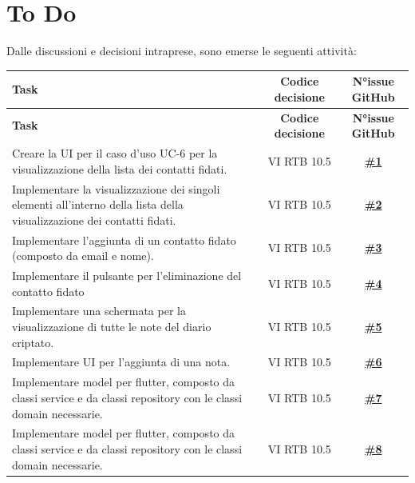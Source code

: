\documentclass[a4paper,12pt]{article}
\begin{document}
\section{To Do}
Dalle discussioni e decisioni intraprese, sono emerse le seguenti attività:
\small
\renewcommand{\arraystretch}{1.2}
\begin{longtable}{|p{}|c|c|}
\hline
\rowcolor{gray!60}
\textbf{Task} & \textbf{Codice decisione} & \textbf{N°issue GitHub} \\
\hline
\endfirsthead
\hline
\rowcolor{gray!60}
\textbf{Task} & \textbf{Codice decisione} & \textbf{N°issue GitHub} \\
\hline
\endhead
\hline
\endlastfoot
\rowcolor{white}
Creare la UI per il caso d'uso UC-6 per la visualizzazione della lista dei contatti fidati. & VI RTB 10.5 & \href{https://github.com/SWE-BitByBit/project-PoC/issues/1}{\textbf{\#1}} \\
\hline
\rowcolor{gray!20}
Implementare la visualizzazione dei singoli elementi all'interno della lista della visualizzazione dei contatti fidati. & VI RTB 10.5 & \href{https://github.com/SWE-BitByBit/project-PoC/issues/2}{\textbf{\#2}} \\
\hline
\rowcolor{white}
Implementare l'aggiunta di un contatto fidato (composto da email e nome). & VI RTB 10.5 & \href{https://github.com/SWE-BitByBit/project-PoC/issues/3}{\textbf{\#3}} \\
\hline
\rowcolor{gray!20}
Implementare il pulsante per l'eliminazione del contatto fidato & VI RTB 10.5 & \href{https://github.com/SWE-BitByBit/project-PoC/issues/4}{\textbf{\#4}} \\
\hline
\rowcolor{white}
Implementare una schermata per la visualizzazione di tutte le note del diario criptato. & VI RTB 10.5 & \href{https://github.com/SWE-BitByBit/project-PoC/issues/5}{\textbf{\#5}} \\
\hline
\rowcolor{gray!20}
Implementare UI per l'aggiunta di una nota. & VI RTB 10.5 & \href{https://github.com/SWE-BitByBit/project-PoC/issues/6}{\textbf{\#6}} \\
\hline
\rowcolor{white}
Implementare model per flutter, composto da classi service e da classi repository con le classi domain necessarie. & VI RTB 10.5 & \href{https://github.com/SWE-BitByBit/project-PoC/issues/7}{\textbf{\#7}} \\
\hline
\rowcolor{gray!20}
Implementare model per flutter, composto da classi service e da classi repository con le classi domain necessarie. & VI RTB 10.5 & \href{https://github.com/SWE-BitByBit/project-PoC/issues/8}{\textbf{\#8}} \\

\end{longtable}
\end{document}
